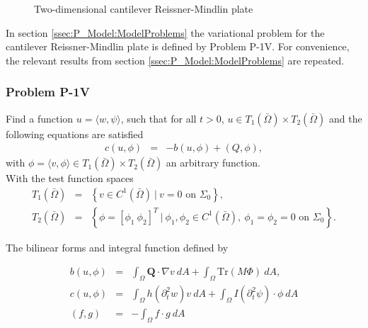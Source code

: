 \documentclass[../../main.tex]{subfiles}
\begin{document}
\begin{figure}[h!]
	\caption{Two-dimensional cantilever Reissner-Mindlin plate}
\end{figure}
\FloatBarrier

In section \ref{ssec:P_Model:ModelProblems} the variational problem for the cantilever Reissner-Mindlin plate is defined by Problem P-1V. For convenience, the relevant results from section \ref{ssec:P_Model:ModelProblems} are repeated.

\subsubsection{Problem P-1V}
Find a function $u = \langle w, \psi \rangle$, such that for all $t>0$, $u \in T_1({\bar{\Omega}}) \times T_2({\bar{\Omega}})$ and the following equations are satisfied
\begin{eqnarray}
	c(u,\phi) &=& -b(u,\phi) + (Q,\phi), \label{eq:P_Model:ProblemP1V1}
\end{eqnarray} with $\phi = \langle v, \phi \rangle  \in T_1({\bar{\Omega}}) \times T_2({\bar{\Omega}})$ an arbitrary function.\\

With the test function spaces
\begin{eqnarray*}
	T_1(\bar{\Omega}) & = & \left \{v \in C^1(\bar{\Omega})\ | \ v = 0 \textrm{ on } \Sigma_0\right\},\\
	T_2(\bar{\Omega}) & = & \left \{ \phi = \left[ \phi_1 \ \phi_2 \right]^T \ | \ \phi_1, \phi_2 \in C^1(\bar{\Omega}), \ \phi_1 = \phi_2 = 0 \textrm{ on } \Sigma_0 \right\}.
\end{eqnarray*}

The bilinear forms and integral function defined by

\begin{eqnarray*}
	b(u,\phi) & = & \int_\Omega \boldsymbol{Q} \cdot \nabla v \ dA + \int_{\Omega} \textrm{Tr}(M\Phi) \ dA,\\
	c(u,\phi) & = & \int_\Omega h (\partial_t^2 w) v \ dA + \int_\Omega I (\partial_t^2 \psi) \cdot \phi \ dA \\
	(f,g) &=& -\int_{\Omega} f\cdot g \ dA \label{eq:2D_Model:Bilinear_int}
\end{eqnarray*}
\end{document}
